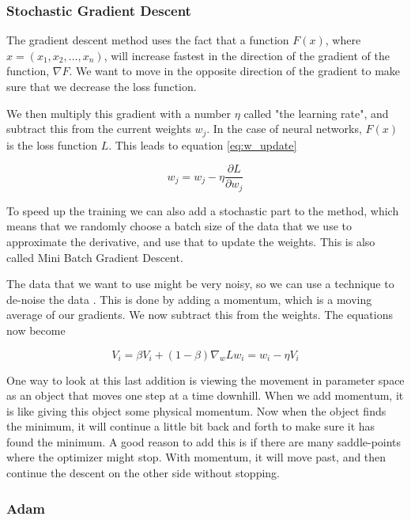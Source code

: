 \subsubsection{Stochastic Gradient Descent\cite{training_model}}

The gradient descent method uses the fact that a function $F(x)$, where $x = (x_1,x_2,...,x_n)$, will increase fastest in the direction of the gradient of the function, $\nabla F$. We want to move in the opposite direction of the gradient to make sure that we decrease the loss function.

We then multiply this gradient with a number $\eta$ called "the learning rate", and subtract this from the current weights $w_j$. In the case of neural networks, $F(x)$ is the loss function $L$. This leads to equation \ref{eq:w_update} 

\begin{equation}
    w_j = w_j - \eta\frac{\partial L}{\partial w_j}
    \label{eq:w_update}
\end{equation}

To speed up the training we can also add a stochastic part to the method, which means that we randomly choose a batch size of the data that we use to approximate the derivative, and use that to update the weights. This is also called Mini Batch Gradient Descent. 

The data that we want to use might be very noisy, so we can use a technique to de-noise the data \cite{SGD_momentum}. This is done by adding a momentum, which is a moving average of our gradients. We now subtract this from the weights. The equations now become 

\begin{equation}
    V_i = \beta V_i + (1 - \beta)\nabla_w L
    w_i = w_i - \eta V_i
    \label{eq:momentum}
\end{equation}

One way to look at this last addition is viewing the movement in parameter space as an object that moves one step at a time downhill. When we add momentum, it is like giving this object some physical momentum. Now when the object finds the minimum, it will continue a little bit back and forth to make sure it has found the minimum. A good reason to add this is if there are many saddle-points where the optimizer might stop. With momentum, it will move past, and then continue the descent on the other side without stopping.

\subsubsection{Adam\cite{Goodfellow-et-al-2016}}

